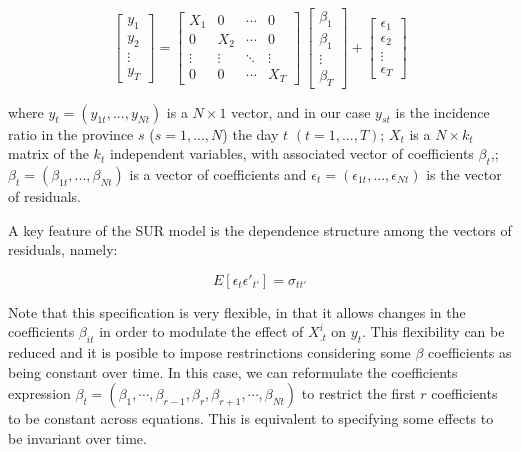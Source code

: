 \documentclass[]{elsarticle} %
\begin{document}
\begin{equation}
\label{eq:sur-sim}
\begin{bmatrix}
y_1 \\ y_2 \\ \vdots \\ y_T
\end{bmatrix}
=
  \begin{bmatrix}
X_1 & 0 & \cdots & 0 \\ 0 & X_2 & \cdots & 0 \\ \vdots & \vdots & \ddots & \vdots \\ 0 & 0 & \cdots & X_T
\end{bmatrix}
\
\begin{bmatrix}
\beta_1 \\ \beta_1 \\ \vdots \\ \beta_T
\end{bmatrix}
+
\begin{bmatrix}
\epsilon_1 \\ \epsilon_2 \\ \vdots \\ \epsilon_T
\end{bmatrix}
\end{equation}

\noindent where \(y_{t}=(y_{1t},...,y_{Nt})\) is a \(N \times 1\)
vector, and in our case \(y_{st}\) is the incidence ratio in the
province \(s\) (\(s=1,...,N\)) the day \(t\) \((t=1,...,T)\); \(X_t\) is
a \(N \times k_t\) matrix of the \(k_t\) independent variables, with
associated vector of coefficients \(\beta_t\),;
\(\beta_t=(\beta_{1t},...,\beta_{Nt})\) is a vector of coefficients and
\(\epsilon_t=(\epsilon_{1t},...,\epsilon_{Nt})\) is the vector of
residuals.

A key feature of the SUR model is the dependence structure among the
vectors of residuals, namely:

\begin{equation}
\label{eq:sur-err}
E[\epsilon_t \epsilon'_{t'}]=\sigma_{tt'}
\end{equation}

Note that this specification is very flexible, in that it allows changes
in the coefficients \(\beta_{it}\) in order to modulate the effect of
\(X^i_{.t}\) on \(y_t\). This flexibility can be reduced and it is
posible to impose restrinctions considering some \(\beta\) coefficients
as being constant over time. In this case, we can reformulate the
coefficients expression
\(\beta_t = (\beta_{1}, \cdots, \beta_{r-1}, \beta_{r}, \beta_{r+1}, \cdots, \beta_{Nt})\)
to restrict the first \(r\) coefficients to be constant across
equations. This is equivalent to specifying some effects to be invariant
over time.
\end{document}
